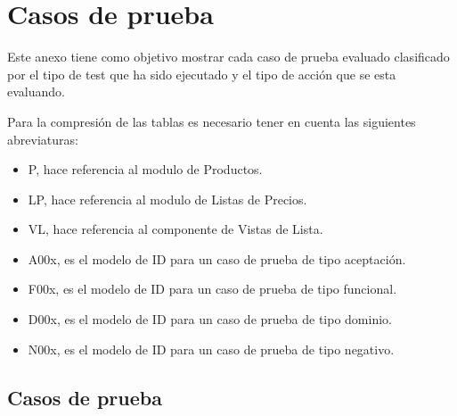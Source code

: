 \chapter{Casos de prueba}\label{appendix}
Este anexo tiene como objetivo mostrar cada caso de prueba evaluado clasificado
por el tipo de test que ha sido ejecutado y el tipo de acción que se esta
evaluando.

Para la compresión de las tablas es necesario tener en cuenta las siguientes
abreviaturas:

\begin{itemize}
    \item P, hace referencia al modulo de Productos.
    \item LP, hace referencia al modulo de Listas de Precios.
    \item VL, hace referencia al componente de Vistas de Lista.
    \item A00x, es el modelo de ID para un caso de prueba de tipo aceptación.
    \item F00x, es el modelo de ID para un caso de prueba de tipo funcional.
    \item D00x, es el modelo de ID para un caso de prueba de tipo dominio.
    \item N00x, es el modelo de ID para un caso de prueba de tipo negativo.
\end{itemize}

\section{Casos de prueba}

